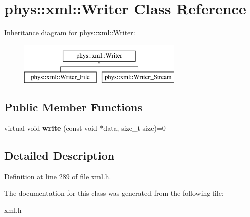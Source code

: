 \hypertarget{classphys_1_1xml_1_1Writer}{
\section{phys::xml::Writer Class Reference}
\label{d2/d28/classphys_1_1xml_1_1Writer}
}
Inheritance diagram for phys::xml::Writer:\begin{figure}[H]
\begin{center}
\leavevmode
\includegraphics[height=2.000000cm]{d2/d28/classphys_1_1xml_1_1Writer}
\end{center}
\end{figure}
\subsection*{Public Member Functions}
\begin{DoxyCompactItemize}
\item 
\hypertarget{classphys_1_1xml_1_1Writer_a7c3e01139166146bb655f32986580e49}{
virtual void {\bfseries write} (const void $\ast$data, size\_\-t size)=0}
\label{d2/d28/classphys_1_1xml_1_1Writer_a7c3e01139166146bb655f32986580e49}

\end{DoxyCompactItemize}


\subsection{Detailed Description}


Definition at line 289 of file xml.h.



The documentation for this class was generated from the following file:\begin{DoxyCompactItemize}
\item 
xml.h\end{DoxyCompactItemize}
